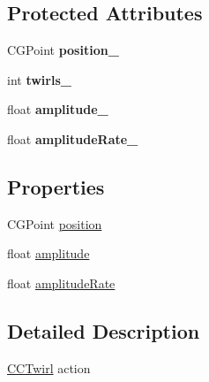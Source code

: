 \subsection*{Protected Attributes}
\begin{DoxyCompactItemize}
\item 
\hypertarget{interface_c_c_twirl_ae7d92a5e34d72fd4b914e024f8e2d7b5}{C\-G\-Point {\bfseries position\-\_\-}}\label{interface_c_c_twirl_ae7d92a5e34d72fd4b914e024f8e2d7b5}

\item 
\hypertarget{interface_c_c_twirl_ad56fd14a57b0711445310cb2dac9a1e5}{int {\bfseries twirls\-\_\-}}\label{interface_c_c_twirl_ad56fd14a57b0711445310cb2dac9a1e5}

\item 
\hypertarget{interface_c_c_twirl_aa2674ef9ec9ad10b8c0a2f7dd763e024}{float {\bfseries amplitude\-\_\-}}\label{interface_c_c_twirl_aa2674ef9ec9ad10b8c0a2f7dd763e024}

\item 
\hypertarget{interface_c_c_twirl_a67426b13c28bf9b7862ee6faa0cad642}{float {\bfseries amplitude\-Rate\-\_\-}}\label{interface_c_c_twirl_a67426b13c28bf9b7862ee6faa0cad642}

\end{DoxyCompactItemize}
\subsection*{Properties}
\begin{DoxyCompactItemize}
\item 
C\-G\-Point \hyperlink{interface_c_c_twirl_abbac5a09daa5e9be9ed1b9fdc2ce672d}{position}
\item 
float \hyperlink{interface_c_c_twirl_abb8aa6adc6cc79d802cb2ef5346be769}{amplitude}
\item 
float \hyperlink{interface_c_c_twirl_abb2856f816f3756c080f2be00a5a2afd}{amplitude\-Rate}
\end{DoxyCompactItemize}


\subsection{Detailed Description}
\hyperlink{interface_c_c_twirl}{C\-C\-Twirl} action 

